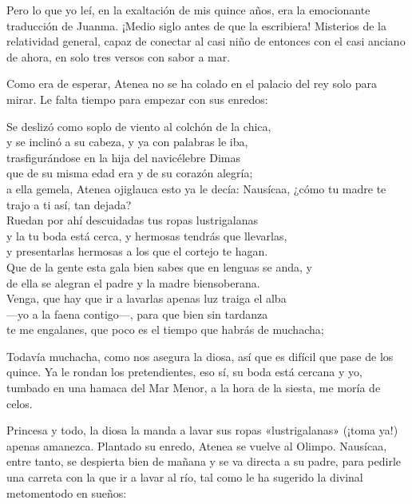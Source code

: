 Pero lo que yo leí, en la exaltación de mis quince años, era la emocionante traducción de Juanma. ¡Medio siglo antes de que la escribiera! Misterios de la relatividad general, capaz de conectar al casi niño de entonces con el casi anciano de ahora, en solo tres versos con sabor a mar.

Como era de esperar, Atenea no se ha colado en el palacio del rey solo para mirar. Le falta tiempo para empezar con sus enredos:

\begin{versocita}
Se deslizó como soplo de viento al colchón de la chica,\\
y se inclinó a su cabeza, y ya con palabras le iba,\\
trasfigurándose en la hija del navicélebre Dimas\\
que de su misma edad era y de su corazón alegría;\\
a ella gemela, Atenea ojiglauca esto ya le decía:
\stanzabreak
Nausícaa, ¿cómo tu madre te trajo a ti así, tan dejada?\\
Ruedan por ahí descuidadas tus ropas lustrigalanas\\
y la tu boda está cerca, y hermosas tendrás que llevarlas,\\
y presentarlas hermosas a los que el cortejo te hagan.\\
Que de la gente esta gala bien sabes que en lenguas se anda, y\\
de ella se alegran el padre y la madre biensoberana.\\
Venga, que hay que ir a lavarlas apenas luz traiga el alba\\
---yo a la faena contigo---, para que bien sin tardanza\\
te me engalanes, que poco es el tiempo que habrás de muchacha;
\end{versocita}

Todavía muchacha, como nos asegura la diosa, así que es difícil que pase de los quince. Ya le rondan los pretendientes, eso sí, su boda está cercana y yo, tumbado en una hamaca del Mar Menor, a la hora de la siesta, me moría de celos.

Princesa y todo, la diosa la manda a lavar sus ropas «lustrigalanas» (¡toma ya!) apenas amanezca. Plantado su enredo, Atenea se vuelve al Olimpo.
Nausícaa, entre tanto, se despierta bien de mañana y se va directa a su padre, para pedirle una carreta con la que ir a lavar al río, tal como le ha sugerido la divinal metomentodo en sueños:

